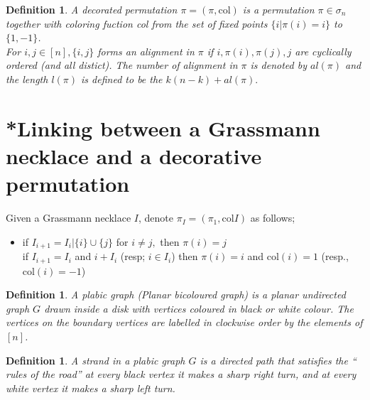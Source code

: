 \documentclass[12pt]{report}
\theoremstyle{theorem}
\newtheorem{definition}[theorem]{Definition}
\begin{document}
\begin{definition}
\normalfont A decorated permutation $\pi = (\pi, \mbox{col})$ is a permutation $\pi \in \sigma_n$ together with coloring fuction col from the set of fixed points $\{i|\pi(i) = i\}$ to $\{1,-1\}$.\\
For $i,j\in[n], \{i,j\}$ forms an alignment in $\pi$ if $i, \pi(i), \pi(j), j$  are cyclically ordered (and all distict). The number of alignment in $\pi$ is denoted by $al(\pi)$ and the length $l(\pi)$ is defined to be the $k(n-k) + al(\pi).$
\end{definition}
\section{*Linking between a Grassmann necklace and a decorative permutation}
Given a Grassmann necklace $I$, denote $\pi_I = (\pi_1, \mbox{col} I)$ as follows;
\begin{itemize}
\item if $I_{i+1} = I_i|\{i\}\cup\{j\}$ for $i\neq j,$ then $\pi(i) = j$\\
if $I_{i+1} = I_i$ and $i+I_i$  (resp; $i\in I_i$) then $\pi(i) = i$ and $\mbox{col}(i) = 1$ (resp., $\mbox{col}(i) = -1$)
\end{itemize}

\begin{definition}
\normalfont A plabic graph (Planar bicoloured graph) is a planar undirected graph $G$ drawn inside a disk with vertices coloured in black or white colour. The vertices on the boundary vertices are labelled in clockwise order by the elements of $[n]$.  
\end{definition}

\begin{definition}
\normalfont A strand in a plabic graph $G$ is a directed path that satisfies the `` rules of the road'' at every black vertex it makes a sharp right turn, and at every white vertex it makes a sharp left turn.
\end{definition}
\end{document}
